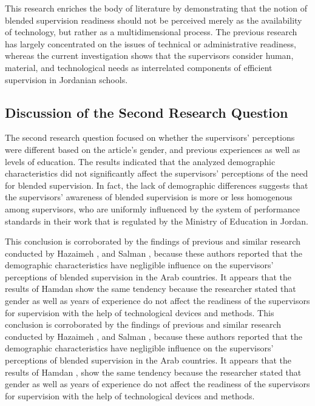 \documentclass[10pt]{NSP1}
\begin{document}
This research enriches the body of literature by demonstrating that the notion of blended supervision readiness should not be perceived merely as the availability of technology, but rather as a multidimensional process. The previous research has largely concentrated on the issues of technical or administrative readiness, whereas the current investigation shows that the supervisors consider human, material, and technological needs as interrelated components of efficient supervision in Jordanian schools.

\subsection{Discussion of the Second Research Question}

\noindent The second research question focused on whether the supervisors' perceptions were different based on the article's gender, and previous experiences as well as levels of education. The results indicated that the analyzed demographic characteristics did not significantly affect the supervisors' perceptions of the need for blended supervision. In fact, the lack of demographic differences suggests that the supervisors' awareness of blended supervision is more or less homogenous among supervisors, who are uniformly influenced by the system of performance standards in their work that is regulated by the Ministry of Education in Jordan.

\noindent This conclusion is corroborated by the findings of previous and similar research conducted by Hazaimeh \cite{ref18}, and Salman \cite{ref22}, because these authors reported that the demographic characteristics have negligible influence on the supervisors' perceptions of blended supervision in the Arab countries. It appears that the results of Hamdan \cite{ref21} show the same tendency because the researcher stated that gender as well as years of experience do not affect the readiness of the supervisors for supervision with the help of technological devices and methods. This conclusion is corroborated by the findings of previous and similar research conducted by Hazaimeh \cite{ref18}, and Salman \cite{ref22}, because these authors reported that the demographic characteristics have negligible influence on the supervisors' perceptions of blended supervision in the Arab countries. It appears that the results of Hamdan \cite{ref21}, show the same tendency because the researcher stated that gender as well as years of experience do not affect the readiness of the supervisors for supervision with the help of technological devices and methods.
\end{document}
